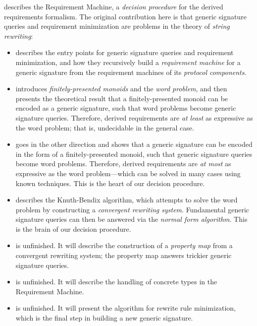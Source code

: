 \documentclass[../generics]{subfiles}
\begin{document}
 describes the Requirement Machine, a \emph{decision procedure} for the derived requirements formalism. The original contribution here is that generic signature queries and requirement minimization are problems in the theory of \emph{string rewriting}:
\begin{itemize}
\item {} describes the entry points for generic signature queries and requirement minimization, and how they recursively build a \emph{requirement machine} for a generic signature from the requirement machines of its \emph{protocol components}.

\item {} introduces \emph{finitely-presented monoids} and the \emph{word problem}, and then presents the theoretical result that a finitely-presented monoid can be encoded as a generic signature, such that word problems become generic signature queries. Therefore, derived requirements are \emph{at least} as expressive as the word problem; that is, undecidable in the general case.

\item {} goes in the other direction and shows that a generic signature can be encoded in the form of a finitely-presented monoid, such that generic signature queries become word problems. Therefore, derived requirements are \emph{at most} as expressive as the word problem---which can be solved in many cases using known techniques. This is the heart of our decision procedure.

\item {} describes the Knuth-Bendix algorithm, which attempts to solve the word problem by constructing a \emph{convergent rewriting system}. Fundamental generic signature queries can then be answered via the \emph{normal form algorithm}. This is the brain of our decision procedure.

\item {} is unfinished. It will describe the construction of a \emph{property map} from a convergent rewriting system; the property map answers trickier generic signature queries.

\item {} is unfinished. It will describe the handling of concrete types in the Requirement Machine.

\item {} is unfinished. It will present the algorithm for rewrite rule minimization, which is the final step in building a new generic signature.
\end{itemize}
\end{document}
